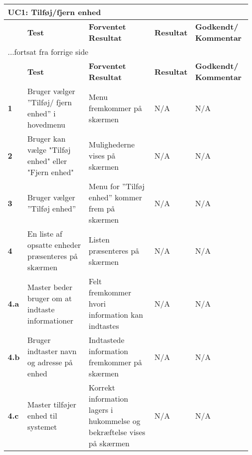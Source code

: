 
\begin{center}
\begin{longtable}{|p{}|p{}|p{}|p{}|p{}|} %
\hline
\multicolumn{5}{|l|}{\textbf{UC1: Tilføj/fjern enhed}} \\ \hline
\multicolumn{1}{|c|}{} &
\textbf{Test} &
\textbf{Forventet \newline Resultat} &
\textbf{Resultat} &
\textbf{Godkendt/ \newline Kommentar} \\ \hline 
\endfirsthead

\multicolumn{5}{l}{...fortsat fra forrige side} \\ \hline 
\multicolumn{1}{|c|}{} &
\textbf{Test} &
\textbf{Forventet \newline Resultat} &
\textbf{Resultat} &
\textbf{Godkendt/ \newline Kommentar} \\ \hline 
\endhead


\textbf{1}	&Bruger vælger ''Tilføj/ fjern enhed'' i hovedmenu 
			&Menu fremkommer på skærmen 
			&N/A 
			&N/A \\\hline
			 
\textbf{2}	&Bruger kan vælge "Tilføj enhed" eller "Fjern enhed" 
			&Mulighederne vises på skærmen 
			&N/A 
			&N/A \\\hline
			 
\textbf{3}	&Bruger vælger ''Tilføj enhed'' 
			&Menu for ''Tilføj enhed'' kommer frem på skærmen 
			&N/A 
			&N/A \\\hline
			 
\textbf{4}	&En liste af opsatte enheder præsenteres på skærmen 
			&Listen præsenteres på skærmen 
			&N/A
			&N/A \\\hline 
			
\textbf{4.a}&Master beder bruger om at indtaste informationer 
			&Felt fremkommer hvori information kan indtastes 
			&N/A 
			&N/A \\\hline
			
\textbf{4.b}&Bruger indtaster navn og adresse på enhed 
			&Indtastede information fremkommer på skærmen 
			&N/A 
			&N/A \\\hline
			 
\textbf{4.c}&Master tilføjer enhed til systemet 
			&Korrekt information lagers i hukommelse og bekræftelse vises på skærmen 
			&N/A 
			&N/A \\\hline
			 

\end{longtable}
\end{center}
